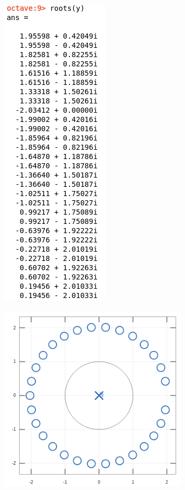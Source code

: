 \documentclass[11pt,a4paper]{article}
\begin{document}
\begin{figure}[H]
\begin{subfigure}{.5\textwidth}
  \centering
  \includegraphics[width=.3\linewidth]{img/polos3.png}
\end{subfigure}%
\begin{subfigure}{.5\textwidth}
  \centering
  \includegraphics[width=1\linewidth]{img/polosg3.png}
\end{subfigure}
\end{figure}
\end{document}
